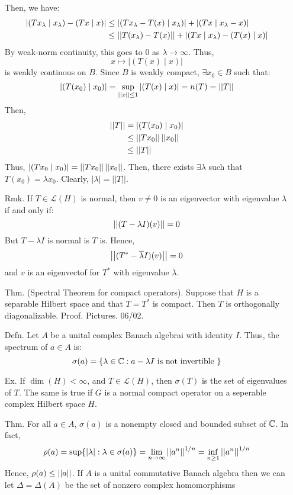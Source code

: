 \documentclass[12pt]{article}
\begin{document}
\begin{itemize}
    Then, we have:
    \begin{align*}
        |(Tx_\lambda \mid x_\lambda) -(Tx \mid x)| &\leq |(Tx_\lambda - T(x) \mid x_\lambda)| + |(Tx \mid x_\lambda - x)| \\
        &\leq \left\vert\left\vert T(x_\lambda)-T(x)\right\vert\right\vert + |(Tx \mid x_\lambda)-(T(x)\mid x)|
    \end{align*}
    By weak-norm continuity, this goes to $0$ as $\lambda \to \infty$. Thus, 
    \[ x \mapsto |(T(x) \mid x)|\]
    is weakly continous on $B$. Since $B$ is weakly compact, $\exists x_0 \in B$ such that:
    \[ |(T(x_0) \mid x_0)| = \sup_{\left\vert\left\vert x\right\vert\right\vert \leq 1} |(T(x) \mid x)| = n(T) = ||T||\]
    Then, 
    \begin{align*}
        \left\vert\left\vert T\right\vert\right\vert &= |(T(x_0) \mid x_0)| \\
        &\leq \left\vert\left\vert Tx_0\right\vert\right\vert\left\vert\left\vert x_0\right\vert\right\vert \\
        &\leq \left\vert\left\vert T\right\vert\right\vert
    \end{align*} 
    Thus, $|(Tx_0 \mid x_0)| = \left\vert\left\vert Tx_0\right\vert\right\vert\left\vert\left\vert x_0\right\vert\right\vert$. Then, there exists $\exists \lambda$ such that $T(x_0) = \lambda x_0$. Clearly, $|\lambda| = ||T||$.
    \item[Rmk.] If $T \in \mathcal{L}(H)$ is normal, then $v \neq 0$ is an eigenvector with eigenvalue $\lambda$ if and only if:
    \[\left\vert\left\vert(T-\lambda I)(v)\right\vert\right\vert = 0\]
    But $T-\lambda I$ is normal is $T$ is. Hence, 
    \[\left\vert\left\vert(T^*-\overline{\lambda}I)(v)\right\vert\right\vert = 0 \]
    and $v$ is an eigenvectof for $T^*$ with eigenvalue $\overline{\lambda}$.
    \item[Thm.] (Spectral Theorem for compact operators). Suppose that $H$ is a separable Hilbert space and that $T = T^*$ is compact. Then $T$ is orthogonally diagonalizable. \bbni
    Proof. Pictures. 06/02.
    \newpage
    \item[Defn.] Let $A$ be a unital complex Banach algebrai with identity $I$. Thus, the spectrum of $a \in A$ is: 
    \[ \sigma(a) = \{\lambda \in \mathbb C : a - \lambda I \text{ is not invertible }\}\]
    \item[Ex.] If $\dim(H) < \infty$, and $T \in \mathcal{L}(H)$, then $\sigma(T)$ is the set of eigenvalues of $T$. The same is true if $G$ is a normal compact operator on a seperable complex Hilbert space $H$. 
    \item[Thm.] For all $ a\in A$, $\sigma(a)$ is a nonempty closed and bounded subset of $\mathbb C$. In fact, 
    \[ \rho(a) = \sup\{|\lambda| : \lambda \in \sigma(a)\} = \lim_{n\to\infty} \left\vert\left\vert a^n\right\vert\right\vert^{1/n} = \inf_{n\geq 1} \left\vert\left\vert a^n\right\vert\right\vert^{1/n}\]
    Hence, $\rho(a) \leq \left\vert\left\vert a\right\vert\right\vert$.
    If $A$ is a unital commutative Banach algebra then we can let $\Delta = \Delta(A)$ be the set of nonzero complex homomorphisms

\end{itemize}
\end{document}
